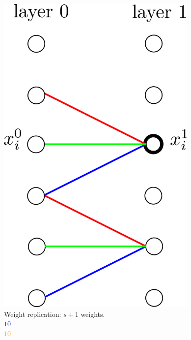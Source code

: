 \documentclass[xcolor=pdftex,dvipsnames,table,mathserif]{beamer}
\begin{document}
{\begin{columns}
    \begin{column}{0.3\textwidth}
      \begin{center}
        \includegraphics[width=0.74\textwidth]{convolutional_layer.png}
        \\ \scriptsize{Weight replication: $s+1$ weights.}
        \\ \textcolor{blue}{\scriptsize{$10$}}
        \\ \textcolor{orange}{\scriptsize{$10$}}

      \end{center}
    \end{column}

  \end{columns}
}
\end{document}

